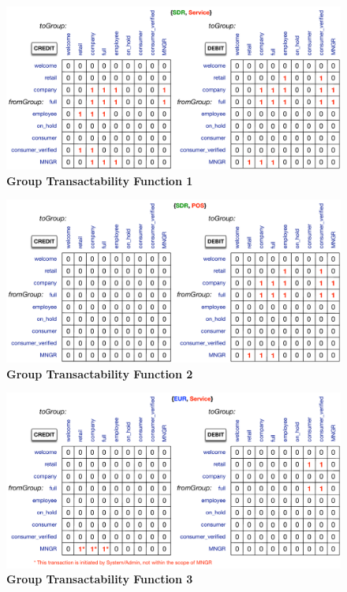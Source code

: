 \begin{figure}[H]
\centering
\includegraphics[width=17cm]{Figures/GTF1}
\caption{\small\textbf{Group Transactability Function 1}}
\label{fig:GTF1}
\end{figure}

\begin{figure}[H]
\centering
\includegraphics[width=17cm]{Figures/GTF2}
\caption{\small\textbf{Group Transactability Function 2}}
\label{fig:GTF2}
\end{figure}

\begin{figure}[H]
\centering
\includegraphics[width=17cm]{Figures/GTF3}
\caption{\small\textbf{Group Transactability Function 3}}
\label{fig:GTF3}
\end{figure}


